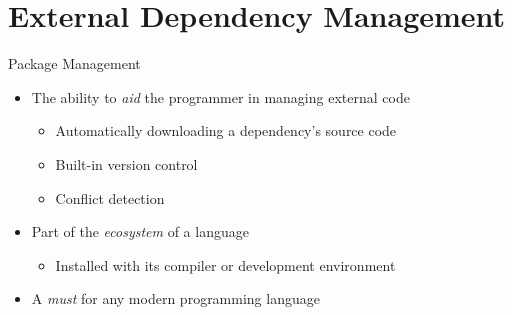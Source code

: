 
\section{External Dependency Management}

\begin{csecframe}{Package Management}

    \begin{itemize}

        \item The ability to \textit{aid} the programmer in managing external code\\
            \begin{itemize}
                \item Automatically downloading a dependency's source code
                \item Built-in version control
                \item Conflict detection
            \end{itemize}

        \item Part of the \textit{ecosystem} of a language\\
            \begin{itemize}
                \item Installed with its compiler or development environment
            \end{itemize}

        \item A \textit{must} for any modern programming language\\

    \end{itemize}

    \vfill

\end{csecframe}

